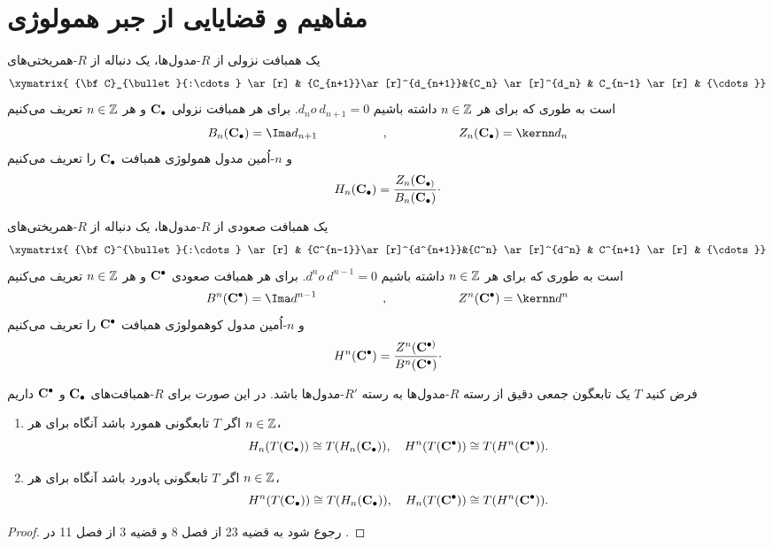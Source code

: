 \section{{ مفاهیم و قضایایی از جبر همولوژی }}
\begin{definition}
یک همبافت
نزولی از $R$-مدول‌ها، یک دنباله از $R$-همریختی‌های
\begin{displaymath}
\xymatrix{
{\bf C}_{\bullet}{:\cdots} \ar[r] & {C_{n+1}}\ar[r]^{d_{n+1}}&{C_n} \ar[r]^{d_n} & C_{n-1} \ar[r] & {\cdots}}
\end{displaymath}
است به طوری که برای هر
$n \in {\Bbb Z}$
داشته باشیم
$d_n o~ d_{n+1} = 0$.
برای هر همبافت نزولی
$\bf {C_{\bullet}}$
و هر
$n \in {\Bbb Z}$
تعریف می‌کنیم
$$B_n({\bf {C_{\bullet}}})=\Ima d_{n+1}~~~~~~~~~~~~~~~~,~~~~~~~~~~~~~~~~~Z_n({\bf C_{\bullet}})=\kernn d_n $$
و $n$-اُمین مدول همولوژی همبافت $\bf C_{\bullet}$ را تعریف می‌کنیم
$$ H_n({\bf{ C_{\bullet}}})=\frac{Z_n(\bf{ C_{\bullet)}}}{B_n(\bf {C_{\bullet}})}\cdot$$
\end{definition}
\begin{definition}
یک همبافت صعودی از $R$-مدول‌ها، یک دنباله از $R$-همریختی‌های
\begin{displaymath}
\xymatrix{
{\bf C}^{\bullet}{:\cdots} \ar[r] & {C^{n-1}}\ar[r]^{d^{n+1}}&{C^n} \ar[r]^{d^n} & C^{n+1} \ar[r] & {\cdots}}
\end{displaymath}
است به طوری که برای هر
$n \in {\Bbb Z}$
داشته باشیم
$d^n o~ d^{n-1} = 0$.
برای هر همبافت صعودی
$\bf {C^{\bullet}}$
و هر
$n \in {\Bbb Z}$
تعریف می‌کنیم
$$B^n({\bf {C^{\bullet}}})=\Ima d^{n-1}~~~~~~~~~~~~~~~~,~~~~~~~~~~~~~~~~~Z^n({\bf C^{\bullet}})=\kernn d^n $$
و $n$-اُمین مدول کوهمولوژی همبافت $\bf C^{\bullet}$ را تعریف می‌کنیم
$$ H^n({\bf{ C^{\bullet}}})=\frac{Z^n(\bf{ C^{\bullet)}}}{B^n(\bf {C^{\bullet}})}\cdot$$
\end{definition}
\begin{theo}\label{TH_n}
فرض کنید $T$ یک تابعگون جمعی دقیق از رسته $R$-مدول‌ها به رسته $R'$-مدول‌ها باشد. در این صورت
برای $R$-همبافت‌های ${\bf C_\bullet }$ و ${\bf C^\bullet }$ داریم
\begin{enumerate}
\item
اگر $T$ تابعگونی همورد باشد آنگاه برای هر $n\in \Bbb Z$،
$$H_n(T({\bf C_{\bullet}})) \cong T(H_n({\bf C_{\bullet}})),\quad H^n(T({\bf C^{\bullet}})) \cong T(H^n({\bf C^{\bullet}})).$$
\item
اگر $T$ تابعگونی پادورد باشد آنگاه برای هر $n\in \Bbb Z$،
$$H^n(T({\bf C_{\bullet}})) \cong T(H_n({\bf C_{\bullet}})),\quad H_n(T({\bf C^{\bullet}})) \cong T(H^n({\bf C^{\bullet}})).$$
\end{enumerate}
\end{theo}
\begin{proof}
رجوع شود به قضیه 23 از فصل 8 و قضیه 3 از فصل 11 در
\cite{foxby}.
\end{proof}

